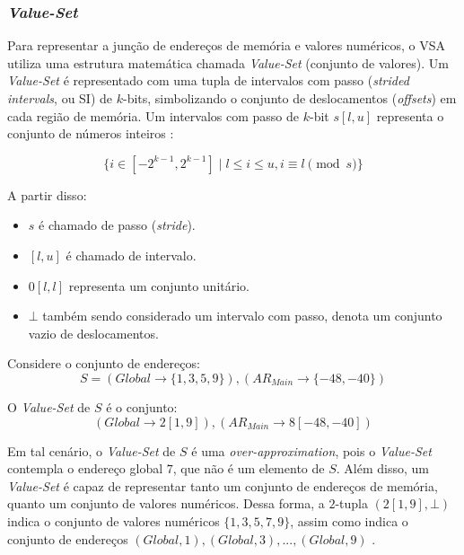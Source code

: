 \documentclass[
    12pt,                %
    openright,           %
    oneside,             %
    a4paper,             %
    english,             %
    brazil               %
]{abntex2}
\begin{document}
\subsubsection{\textit{Value-Set}}

Para representar a junção de endereços de memória e valores numéricos, o VSA utiliza uma estrutura matemática chamada \textit{Value-Set} (conjunto de valores). Um \textit{Value-Set} é representado com uma tupla de intervalos com passo (\textit{strided intervals}, ou SI) de $k$-bits, 
simbolizando o conjunto de deslocamentos (\textit{offsets}) em cada região de memória. Um intervalos com passo de $k$-bit $s[l, u]$ representa o conjunto de números inteiros \cite{Balakrishnan2007}:

\begin{equation}
    \{ i \in [-2^{k-1}, 2^{k-1}] \mid l \leq i \leq u, i \equiv l \pmod{s} \}
\end{equation}

A partir disso:
\begin{itemize}
\item $s$ é chamado de passo (\textit{stride}).
\item $[l,u]$ é chamado de intervalo.
\item $0[l,l]$ representa um conjunto unitário.
\item $\bot$ também sendo considerado um intervalo com passo, denota um conjunto vazio de deslocamentos.
\end{itemize}

Considere o conjunto de endereços:
\begin{equation}
    S = {(Global \rightarrow \{1, 3, 5, 9\}), (AR_{Main} \rightarrow \{-48, -40\})}
\end{equation}

O \textit{Value-Set} de $S$ é o conjunto:
\begin{equation}
    {(Global \rightarrow 2[1, 9]), (AR_{Main} \rightarrow 8[-48, -40])}
\end{equation}

Em tal cenário, o \textit{Value-Set} de $S$ é uma \textit{over-approximation}, pois o \textit{Value-Set} contempla o endereço global $7$, que não é um elemento de $S$.
Além disso, um \textit{Value-Set} é capaz de representar tanto um conjunto de endereços de memória, quanto um conjunto de valores numéricos. Dessa forma, a $2$-tupla $(2[1, 9], \bot)$ indica o conjunto de valores numéricos $\{1, 3, 5, 7, 9\}$, assim como indica o conjunto de endereços ${(Global, 1), (Global, 3), ... , (Global, 9)}$ \cite{Balakrishnan2007}.
\end{document}
